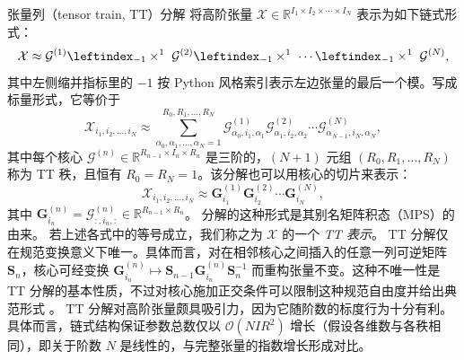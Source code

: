 \documentclass[11pt]{article}
\newcommand{\R}{\mathbb{R}}
\newcommand{\ten}[1]{\mathcal{#1}}
\newcommand{\mat}[1]{\mathbf{#1}}
\begin{document}
张量列（tensor train, TT）分解 \cite{oseledets2011tensor} 将高阶张量 $\ten{X}\in\R^{I_1\times I_2\times \cdots\times I_N}$ 表示为如下链式形式：
\begin{equation}
    \ten{X} \approx \ten{G}^{(1)} \leftindex_{-1} \times^{1} \ \ten{G}^{(2)} \leftindex_{-1} \times^{1} \ \cdots \leftindex_{-1} \times^{1} \ \ten{G}^{(N)},
\end{equation}
其中左侧缩并指标里的 $-1$ 按 Python 风格索引表示左边张量的最后一个模。写成标量形式，它等价于
\begin{equation}
\ten{X}_{i_1, i_2,\dots, i_N} \approx \sum_{\alpha_0, \alpha_1, \dots, \alpha_N=1}^{R_0, R_1, \dots, R_N} \ten{G}^{(1)}_{\alpha_0, i_1, \alpha_1} \ten{G}^{(2)}_{\alpha_1, i_2, \alpha_2} \cdots \ten{G}^{(N)}_{\alpha_{N-1}, i_N, \alpha_N},
\end{equation}
其中每个核心 $\ten{G}^{(n)} \in \R^{R_{n-1} \times I_n \times R_n}$ 是三阶的，$(N+1)$ 元组 $(R_0, R_1, \ldots, R_N)$ 称为 TT 秩，且恒有 $R_0=R_N=1$。该分解也可以用核心的切片来表示：
\begin{equation}
\ten{X}_{i_1, i_2,\dots, i_N} \approx \mat{G}^{(1)}_{i_1}\mat{G}^{(2)}_{i_2}\cdots\mat{G}^{(N)}_{i_N},
\end{equation}
其中 $\mat{G}^{(n)}_{i_n} = \ten{G}^{(n)}_{:, i_n, :} \in\R^{R_{n-1}\times R_n}$。
分解的这种形式是其别名矩阵积态（MPS）的由来。
若上述各式中的等号成立，我们称之为 $\ten{X}$ 的一个 \emph{TT 表示}。
TT 分解仅在规范变换意义下唯一。具体而言，对在相邻核心之间插入的任意一列可逆矩阵 $\mat{S}_n$，核心可经变换 $\mat{G}^{(n)}_{i_n} \mapsto \mat{S}_{n-1} \mat{G}^{(n)}_{i_n} \mat{S}_n^{-1}$ 而重构张量不变。这种不唯一性是 TT 分解的基本性质，不过对核心施加正交条件可以限制这种规范自由度并给出典范形式 \cite{cichocki2015tensor}。
TT 分解对高阶张量颇具吸引力，因为它随阶数的标度行为十分有利。具体而言，链式结构保证参数总数仅以 $\mathcal{O}(N I R^2)$ 增长（假设各维数与各秩相同），即关于阶数 $N$ 是线性的，与完整张量的指数增长形成对比。
\end{document}
